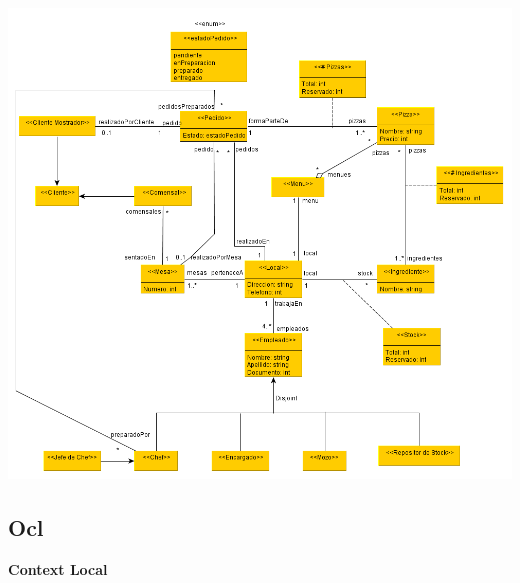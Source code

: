 \documentclass[a4paper,11pt] {article}
\begin{document}
\begin{center}
 \includegraphics[width=1\textwidth]{Diagramas/DiagramaConceptual.png}
\end{center}

\subsection*{Ocl}

\textbf{Context Local}
\end{document}
